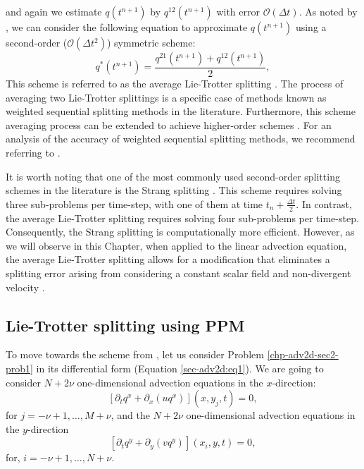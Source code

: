 and again we estimate $q(t^{n+1})$ by $q^{12}(t^{n+1})$ with error $\mathcal{O}(\Delta t)$.
As noted by \citet{strang:1968}, we can consider the following equation 
to approximate $q(t^{n+1})$ using a second-order ($\mathcal{O}(\Delta t^2)$) symmetric scheme:
\begin{equation}
	q^*(t^{n+1}) = \frac{q^{21}(t^{n+1}) + q^{12}(t^{n+1})}{2},
\end{equation}
This scheme is referred to as the average Lie-Trotter splitting \citep{holden:2010}.
The process of averaging two Lie-Trotter splittings is a specific case of methods
known as weighted sequential splitting methods in the literature.
Furthermore, this scheme averaging process can be extended to achieve higher-order schemes \citep{jia:2011}.
For an analysis of the accuracy of weighted sequential splitting methods, we recommend referring to \citet{csomos:2005}.


It is worth noting that one of the most commonly used second-order splitting schemes in the literature is the Strang splitting
\citep{strang:1968}.
This scheme requires solving three sub-problems per time-step, with one of them at time $t_n + \frac{\Delta t}{2}$.
In contrast, the average Lie-Trotter splitting requires solving four sub-problems per time-step.
Consequently, the Strang splitting is computationally more efficient.
However, as we will observe in this Chapter, when applied to the linear advection equation, 
the average Lie-Trotter splitting allows for a modification that eliminates a splitting error
arising from considering a constant scalar field and non-divergent velocity \citep{lin:1996}.

\subsection{Lie-Trotter splitting using PPM}
To move towards the scheme from \citet{lin:1996}, let us consider Problem \ref{chp-adv2d-sec2-prob1} in its differential form (Equation \eqref{sec-adv2d:eq1}).
We are going to consider $N+2\nu$ one-dimensional advection equations in the $x$-direction:
\begin{equation*}
	\label{chp-adv2d-adv2deq-xdir1}
	[{\partial_t q^x}+{\partial_x (uq^x)}](x, y_j, t)
	= 0,
\end{equation*}
for $j=-\nu+1, \ldots, M+\nu$,
and the $N+2\nu$ one-dimensional advection equations in the $y$-direction
\begin{equation*}
	\label{chp-adv2d-adv2deq-ydir1}
	[{\partial_t q^y} +{\partial_y (vq^y)}](x_i, y, t) = 0,
\end{equation*}
for, $i=-\nu+1, \ldots, N+\nu$.

